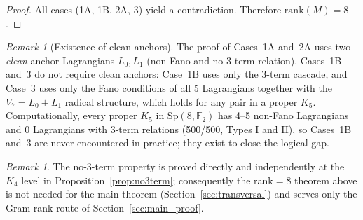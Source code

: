 \documentclass[11pt,a4paper]{article}
\theoremstyle{remark}
\newtheorem{remark}[theorem]{Remark}
\newcommand{\Sp}{\mathrm{Sp}}
\begin{document}
\begin{proof}
\medskip
All cases (1A, 1B, 2A, 3) yield a contradiction.
Therefore $\mathrm{rank}(M) = 8$.
\end{proof}

\begin{remark}[Existence of clean anchors]\label{rem:nonfano_exist}
The proof of Cases~1A and~2A uses two \emph{clean} anchor Lagrangians $L_0, L_1$
(non-Fano and no 3-term relation).
Cases~1B and~3 do not require clean anchors: Case~1B uses only the 3-term cascade,
and Case~3 uses only the Fano conditions of all 5 Lagrangians together with the
$V_7 = L_0 + L_1$ radical structure, which holds for any pair in a proper $K_5$.
Computationally, every proper $K_5$ in $\Sp(8,\mathbb{F}_2)$ has 4--5 non-Fano
Lagrangians and 0 Lagrangians with 3-term relations (500/500, Types I and II),
so Cases~1B and~3 are never encountered in practice; they exist to close the logical gap.
\end{remark}

\begin{remark}
The no-3-term property is proved directly and independently at the $K_4$ level in
Proposition~\ref{prop:no3term}; consequently the rank$=8$ theorem above is not
needed for the main theorem (Section~\ref{sec:transversal}) and serves only the
Gram rank route of Section~\ref{sec:main_proof}.
\end{remark}
\end{document}
